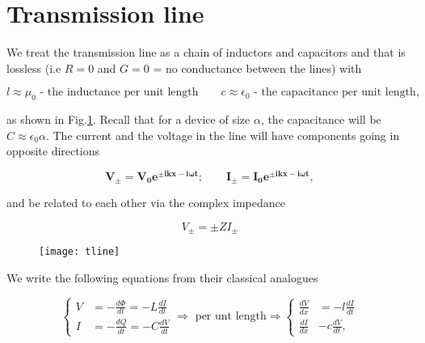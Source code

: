 
\section{Transmission line}

We treat the  transmission line as a chain of  inductors and capacitors
and that  is lossless  (i.e $  R=0 $  and $ G  = 0  $ =  no conductance
between the lines) with

  \begin{equation}
    l \approx \mu_0 \text{ - the inductance per unit length}\qquad c \approx \epsilon_0 \text{ - the capacitance per unit length},
  \end{equation}

  \noindent as shown in Fig.\ref{transtLine}.  Recall that for a device
  of     size     $     \alpha     $,    the     capacitance     will     be
  $ C  \approx \epsilon_0\alpha $.  The  current and the voltage  in the line
  will have components going in opposite directions

  \begin{equation}
    \label{tlineCurrentVoltage}
    \mathbf{V_{\pm} = V_0e^{\pm ikx-i\omega t};\qquad I_{\pm} = I_0e^{\pm ikx-i\omega t}},
  \end{equation}

  \noindent and be related to each other via the complex impedance

 \begin{equation}
   V_{\pm}= \pm ZI_{\pm}
 \end{equation}

 \begin{figure}
   \caption{ \label{transtLine}}
   \texttt{[image: tline]}
 \end{figure}

 \noindent  We  write  the  following equations  from  their  classical
 analogues

 \begin{equation}
   \left\lbrace \begin{aligned}
       V & = -\frac{d\Phi}{dt} = -L\frac{dI}{dt}\\
       I & = -\frac{dQ}{dt} = -C\frac{dV}{dt}
     \end{aligned}\right.\Rightarrow \text{ per unt length} \Rightarrow
   \left\lbrace \begin{aligned}
       \frac{dV}{dx} & = - l\frac{dI}{dt}\\
       \frac{dI}{dx} & - c\frac{dV}{dt},
     \end{aligned}\right.
   \label{tlineDiff}
 \end{equation}


